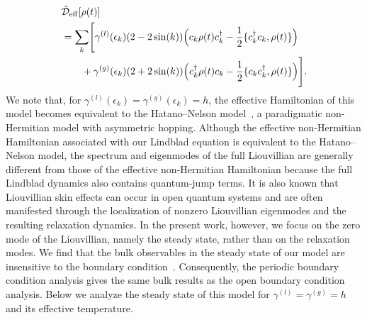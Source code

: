 \documentclass[a4paper, amsfonts, amssymb, amsmath, reprint, showkeys, nofootinbib, twoside,superscriptaddress, prb]{revtex4-2}
\newcommand{\m}[1]{\mathcal{#1}}
\newcommand{\mr}[1]{\mathrm{#1}}
\begin{document}
\begin{align}
&\tilde{\m{D}}_{\mr{eff}}[\rho(t)] \nonumber\\
&=\sum_k \Biggl[\gamma^{(l)}(\epsilon_k) (2-2\sin(k))\Bigl(c_k\rho(t)c_k^{\dagger} - \frac{1}{2}\{c_k^{\dagger}c_k, \rho(t)\}\Bigr)\nonumber\\
&\quad\quad +\gamma^{(g)}(\epsilon_k) (2+2\sin(k))\Bigl(c_k^{\dagger}\rho(t)c_k - \frac{1}{2}\{c_kc_k^{\dagger}, \rho(t)\}\Bigr)\Biggr].\label{jump_current2}
\end{align}
We note that, for $\gamma^{(l)}(\epsilon_k)=\gamma^{(g)}(\epsilon_k)=h$, the effective Hamiltonian of this model becomes equivalent to the Hatano--Nelson model~\cite{Hatano1998-jg,Hatano1996-sw}, a paradigmatic non-Hermitian model with asymmetric hopping. 
Although the effective non-Hermitian Hamiltonian associated with our Lindblad equation is equivalent to the Hatano--Nelson model, the spectrum and eigenmodes of the full Liouvillian are generally different from those of the effective non-Hermitian Hamiltonian because the full Lindblad dynamics also contains quantum-jump terms. It is also known that Liouvillian skin effects can occur in open quantum systems and are often manifested through the localization of nonzero Liouvillian eigenmodes and the resulting relaxation dynamics\cite{Song2019,Haga2021,Yang2022}. In the present work, however, we focus on the zero mode of the Liouvillian, namely the steady state, rather than on the relaxation modes. We find that the bulk observables in the steady state of our model are insensitive to the boundary condition~\cite{Supple}. Consequently, the periodic boundary condition analysis gives the same bulk results as the open boundary condition analysis.
Below we analyze the steady state of this model for $\gamma^{(l)} = \gamma^{(g)} = h$ and its effective temperature. 
\end{document}
